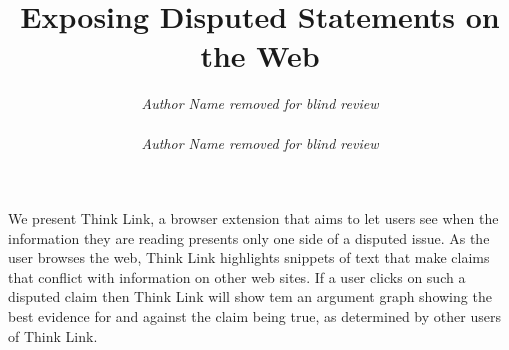 \documentclass{chi2009}
\begin{document}

\toappear{}



\title{Exposing Disputed Statements on the Web}


\author{
\parbox[t]{9cm}{\centering
	     {\em Author Name removed for blind review}\\
}
\parbox[t]{9cm}{\centering
	     {\em Author Name removed for blind review}}
}

\maketitle


\abstract
We present Think Link, a browser extension that aims to let users see when the information they are reading presents only one side of a disputed issue. As the user browses the web, Think Link highlights snippets of text that make claims that conflict with information on other web sites. If a user clicks on such a disputed claim then Think Link will show tem an argument graph showing the best evidence for and against the claim being true, as determined by other users of Think Link.





\end{document}
